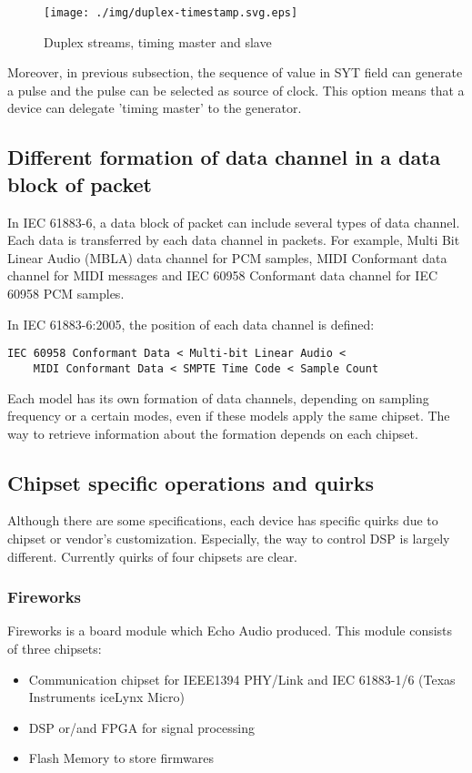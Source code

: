 \documentclass[onecolumn]{article}
\begin{document}
\begin{figure}[H]
	\centering
	\texttt{[image: ./img/duplex-timestamp.svg.eps]}
	\caption{{Duplex streams, timing master and slave}}
	\label{duplex-timestamp}
\end{figure}

Moreover, in previous subsection, the sequence of value in SYT field can generate a pulse and the pulse can be selected as source of clock. This option means that a device can delegate 'timing master' to the generator.


\subsection{Different formation of data channel in a data block of packet}

In IEC 61883-6\cite{iec61883-6-1, iec61883-6-2}, a data block of packet can include several types of data channel. Each data is transferred by each data channel in packets. For example, Multi Bit Linear Audio (MBLA) data channel for PCM samples, MIDI Conformant data channel for MIDI messages and IEC 60958 Conformant data channel for IEC 60958 PCM samples.

In IEC 61883-6:2005\cite{iec61883-6-2}, the position of each data channel is defined:
\begin{verbatim}
IEC 60958 Conformant Data < Multi-bit Linear Audio <
	MIDI Conformant Data < SMPTE Time Code < Sample Count
\end{verbatim}

Each model has its own formation of data channels, depending on sampling frequency or a certain modes, even if these models apply the same chipset. The way to retrieve information about the formation depends on each chipset.

\subsection{Chipset specific operations and quirks}

Although there are some specifications, each device has specific quirks due to chipset or vendor's customization. Especially, the way to control DSP is largely different. Currently quirks of four chipsets are clear.

\subsubsection{Fireworks}
Fireworks is a board module which Echo Audio produced. This module consists of three chipsets:
\begin{itemize}
\item Communication chipset for IEEE1394 PHY/Link and IEC 61883-1/6 (Texas Instruments iceLynx Micro)
\item DSP or/and FPGA for signal processing
\item Flash Memory to store firmwares
\end{itemize}
\end{document}
